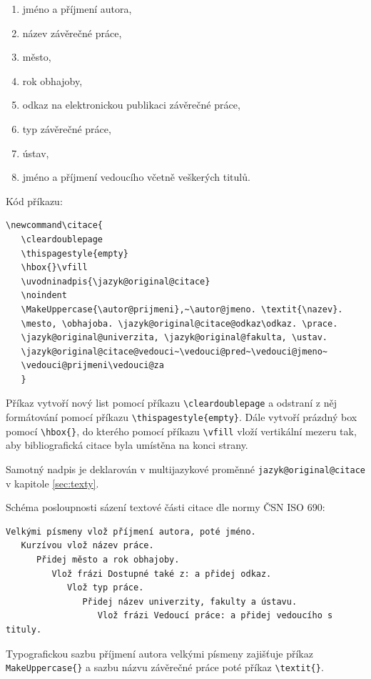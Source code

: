 \begin{enumerate}
	\item jméno a příjmení autora,
	\item název závěrečné práce,
	\item město,
	\item rok obhajoby,
	\item odkaz na elektronickou publikaci závěrečné práce,
	\item typ závěrečné práce,
	\item ústav,
	\item jméno a příjmení vedoucího včetně veškerých titulů.
\end{enumerate}

Kód příkazu:

\begin{verbatim}
\newcommand\citace{
   \cleardoublepage
   \thispagestyle{empty}
   \hbox{}\vfill
   \uvodninadpis{\jazyk@original@citace}
   \noindent
   \MakeUppercase{\autor@prijmeni},~\autor@jmeno. \textit{\nazev}.
   \mesto, \obhajoba. \jazyk@original@citace@odkaz\odkaz. \prace.
   \jazyk@original@univerzita, \jazyk@original@fakulta, \ustav.
   \jazyk@original@citace@vedouci~\vedouci@pred~\vedouci@jmeno~
   \vedouci@prijmeni\vedouci@za
   }
\end{verbatim}

Příkaz vytvoří nový list pomocí příkazu \verb|\cleardoublepage| a odstraní z něj formátování pomocí příkazu \verb|\thispagestyle{empty}|. Dále vytvoří prázdný box pomocí \verb|\hbox{}|, do kterého pomocí příkazu \verb|\vfill| vloží vertikální mezeru tak, aby bibliografická citace byla umístěna na konci strany.

Samotný nadpis je deklarován v multijazykové proměnné \verb|jazyk@original@citace| v kapitole \ref{sec:texty}.

Schéma posloupnosti sázení textové části citace dle normy ČSN ISO 690:

\begin{verbatim}
Velkými písmeny vlož příjmení autora, poté jméno.
   Kurzívou vlož název práce.
      Přidej město a rok obhajoby.
         Vlož frázi Dostupné také z: a přidej odkaz.
            Vlož typ práce.
               Přidej název univerzity, fakulty a ústavu.
                  Vlož frázi Vedoucí práce: a přidej vedoucího s tituly.
\end{verbatim}

Typografickou sazbu příjmení autora velkými písmeny zajišťuje příkaz \verb|MakeUppercase{}| a sazbu názvu závěrečné práce poté příkaz \verb|\textit{}|.

